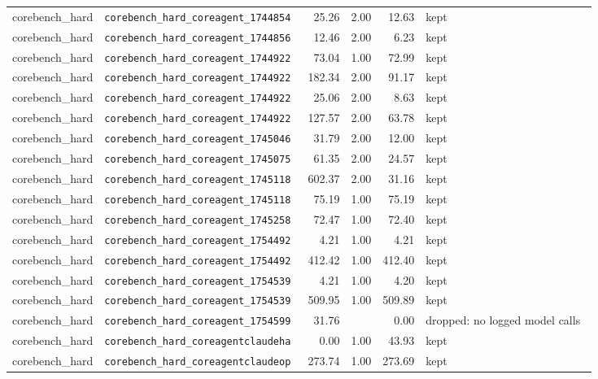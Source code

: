 {\begin{longtable}{llrrrl}
corebench\_hard & \texttt{\scriptsize corebench\_hard\_coreagent\_1744854~} & 25.26 & 2.00 & 12.63 & kept \\
corebench\_hard & \texttt{\scriptsize corebench\_hard\_coreagent\_1744856~} & 12.46 & 2.00 & 6.23 & kept \\
corebench\_hard & \texttt{\scriptsize corebench\_hard\_coreagent\_1744922~} & 73.04 & 1.00 & 72.99 & kept \\
corebench\_hard & \texttt{\scriptsize corebench\_hard\_coreagent\_1744922~} & 182.34 & 2.00 & 91.17 & kept \\
corebench\_hard & \texttt{\scriptsize corebench\_hard\_coreagent\_1744922~} & 25.06 & 2.00 & 8.63 & kept \\
corebench\_hard & \texttt{\scriptsize corebench\_hard\_coreagent\_1744922~} & 127.57 & 2.00 & 63.78 & kept \\
corebench\_hard & \texttt{\scriptsize corebench\_hard\_coreagent\_1745046~} & 31.79 & 2.00 & 12.00 & kept \\
corebench\_hard & \texttt{\scriptsize corebench\_hard\_coreagent\_1745075~} & 61.35 & 2.00 & 24.57 & kept \\
corebench\_hard & \texttt{\scriptsize corebench\_hard\_coreagent\_1745118~} & 602.37 & 2.00 & 31.16 & kept \\
corebench\_hard & \texttt{\scriptsize corebench\_hard\_coreagent\_1745118~} & 75.19 & 1.00 & 75.19 & kept \\
corebench\_hard & \texttt{\scriptsize corebench\_hard\_coreagent\_1745258~} & 72.47 & 1.00 & 72.40 & kept \\
corebench\_hard & \texttt{\scriptsize corebench\_hard\_coreagent\_1754492~} & 4.21 & 1.00 & 4.21 & kept \\
corebench\_hard & \texttt{\scriptsize corebench\_hard\_coreagent\_1754492~} & 412.42 & 1.00 & 412.40 & kept \\
corebench\_hard & \texttt{\scriptsize corebench\_hard\_coreagent\_1754539~} & 4.21 & 1.00 & 4.20 & kept \\
corebench\_hard & \texttt{\scriptsize corebench\_hard\_coreagent\_1754539~} & 509.95 & 1.00 & 509.89 & kept \\
corebench\_hard & \texttt{\scriptsize corebench\_hard\_coreagent\_1754599~} & 31.76 &  & 0.00 & dropped: no logged model calls~ \\
corebench\_hard & \texttt{\scriptsize corebench\_hard\_coreagentclaudeha~} & 0.00 & 1.00 & 43.93 & kept \\
corebench\_hard & \texttt{\scriptsize corebench\_hard\_coreagentclaudeop~} & 273.74 & 1.00 & 273.69 & kept \\

\end{longtable}}
